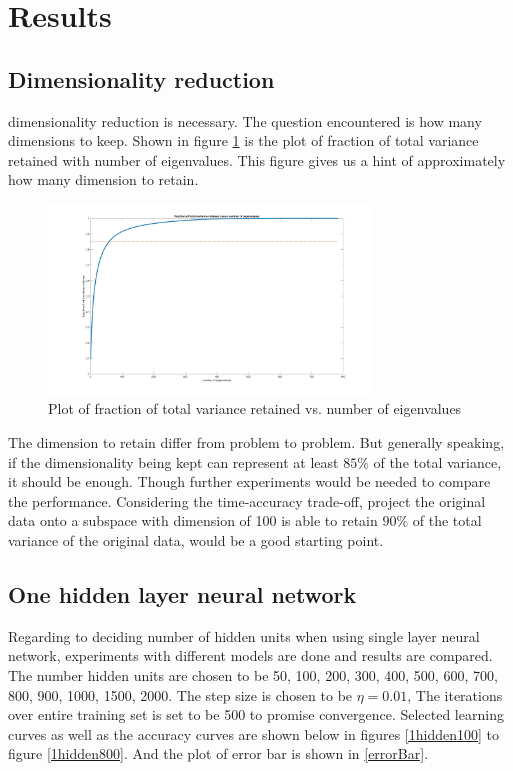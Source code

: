 \documentclass[conference]{IEEEtran}
\begin{document}
\section{Results}
\subsection{Dimensionality reduction} 

dimensionality reduction is necessary. The question encountered is how many dimensions to keep. Shown in figure \ref{PCA} is the plot of fraction of total variance retained with number of eigenvalues. This figure gives us a hint of approximately how many dimension to retain.
\begin{figure}[h!]
\centerline{\includegraphics[width=3.4in]{PCA.jpg}}
\caption{Plot of fraction of total variance retained vs. number of eigenvalues}
\label{PCA}
\end{figure}

The dimension to retain differ from problem to problem. But generally speaking, if the dimensionality being kept can represent at least $85\%$ of the total variance, it should be enough. Though further experiments would be needed to compare the performance. Considering the time-accuracy trade-off, project the original data onto a subspace with dimension of 100 is able to retain $90\%$ of the total variance of the original data, would be a good starting point.

\subsection{One hidden layer neural network} Regarding to deciding number of hidden units when using single layer neural network, experiments with different models are done and results are compared. The number hidden units are chosen to be 50, 100, 200, 300, 400, 500, 600, 700, 800, 900, 1000, 1500, 2000. The step size is chosen to be $\eta = 0.01$, The iterations over entire training set is set to be 500 to promise convergence. Selected learning curves as well as the accuracy curves are shown below in figures \ref{1hidden100} to figure \ref{1hidden800}. And the plot of error bar is shown in \ref{errorBar}.
\end{document}
